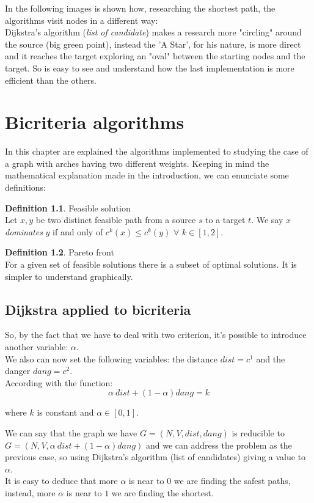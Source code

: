 \documentclass[a4paper,12pt]{report}
\begin{document}
In the following images is shown how, researching the shortest path, the algorithms visit nodes in a different way:\\
Dijkstra's algorithm (\textit{list of candidate}) makes a research more "circling" around the source (big green point), instead the 'A Star', for his nature, is more direct and it reaches the target exploring an "oval" between the starting nodes and the target. So is easy to see and understand how the last implementation is more efficient than the others.  

\chapter{Bicriteria algorithms}

In this chapter are explained the algorithms implemented to studying the case of a graph with arches having two different weights.
Keeping in mind the mathematical explanation made in the introduction, we can enunciate some definitions:

\theoremstyle{definition}
\newtheorem{definition}{Definition}
\begin{definition}{Feasible solution}\\
	Let $x, y$ be two distinct feasible path from a source $s$ to a target $t$. We say $x$ \emph{dominates} $y$ if and only of $c^k(x) \leq c^k(y)$ $\forall$ $k \in [1,2]$.
\end{definition}

\theoremstyle{definition}
\begin{definition}{Pareto front}\\
	For a given set of feasible solutions there is a subset of optimal solutions. It is simpler to understand graphically.
\end{definition}

\section{Dijkstra applied to bicriteria}
So, by the fact that we have to deal with two criterion, it's possible to introduce another variable: $\alpha$.\\
We also can now set the following variables: the distance $dist=c^1$ and the danger $dang=c^2$.\\
According with the function: $$\alpha\ dist + (1-\alpha) dang = k $$ \begin{center}
	where $k$ is constant and $\alpha \in [0, 1]$.
\end{center}
We can say that the graph we have $G=(N,V,dist,dang)$ is reducible to $G=(N,V,\alpha\ dist + (1-\alpha) dang)$ and we can address the problem as the previous case, so using Dijkstra's algorithm (list of candidates) giving a value to $\alpha$.\\
It is easy to deduce that more $\alpha$ is near to $0$ we are finding the safest paths, instead, more $\alpha$ is near to $1$ we are finding the shortest. 
\end{document}

